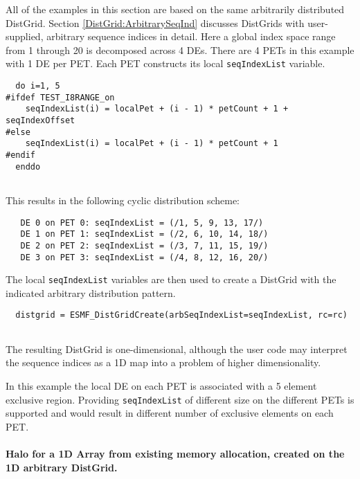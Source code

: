    All of the examples in this section are based on the same arbitrarily
   distributed DistGrid. Section \ref{DistGrid:ArbitrarySeqInd} discusses
   DistGrids with user-supplied, arbitrary sequence indices in detail. Here
   a global index space range from 1 through 20 is decomposed across 4 DEs. 
   There are 4 PETs in this example with 1 DE per PET. Each PET constructs
   its local {\tt seqIndexList} variable. 

 \begin{verbatim}
  do i=1, 5
#ifdef TEST_I8RANGE_on
    seqIndexList(i) = localPet + (i - 1) * petCount + 1 + seqIndexOffset
#else
    seqIndexList(i) = localPet + (i - 1) * petCount + 1
#endif
  enddo
 
\end{verbatim}
 

   This results in the following cyclic distribution scheme:
   \begin{verbatim}
   DE 0 on PET 0: seqIndexList = (/1, 5, 9, 13, 17/)
   DE 1 on PET 1: seqIndexList = (/2, 6, 10, 14, 18/)
   DE 2 on PET 2: seqIndexList = (/3, 7, 11, 15, 19/)
   DE 3 on PET 3: seqIndexList = (/4, 8, 12, 16, 20/)
   \end{verbatim}
  
   The local {\tt seqIndexList} variables are then used to create a
   DistGrid with the indicated arbitrary distribution pattern. 

 \begin{verbatim}
  distgrid = ESMF_DistGridCreate(arbSeqIndexList=seqIndexList, rc=rc)
 
\end{verbatim}
 

   The resulting DistGrid is one-dimensional, although the user code may
   interpret the sequence indices as a 1D map into a problem of higher
   dimensionality. 
   
   In this example the local DE on each PET is associated with a 5 element
   exclusive region. Providing {\tt seqIndexList} of different size on the
   different PETs is supported and would result in different number of
   exclusive elements on each PET.
  
   \paragraph{Halo for a 1D Array from existing memory allocation, created on
   the 1D arbitrary DistGrid.}
   \mbox{} \\
   
